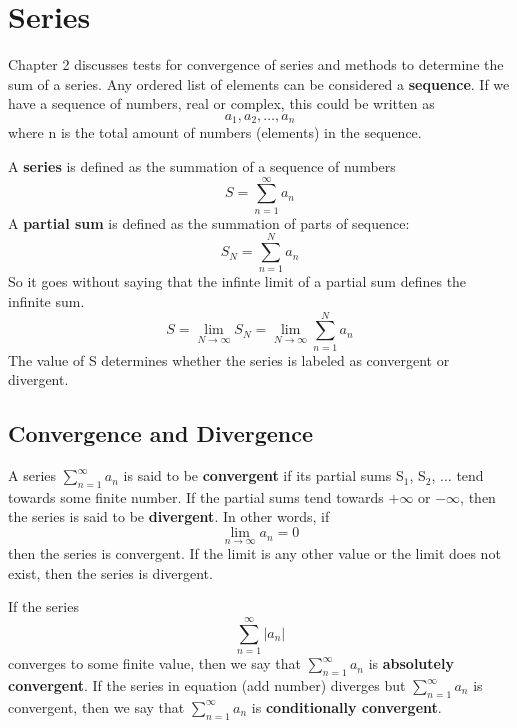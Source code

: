 \documentclass{article}
\newcommand{\be}{\begin{equation}}
\newcommand{\ee}{\end{equation}}
\begin{document}
\section*{Series}
Chapter 2 discusses tests for convergence of series and methods to determine the sum of a series.
Any ordered list of elements can be considered a \textbf{sequence}.
If we have a sequence of numbers, real or complex, this could be written as
\be
  a_1, a_2, \hdots, a_n
\ee
where n is the total amount of numbers (elements) in the sequence.

A \textbf{series} is defined as the summation of a sequence of numbers
\be
S=\sum_{n=1}^{\infty} a_n
\ee
A \textbf{partial sum} is defined as the summation of parts of sequence:
\be
S_N = \sum_{n=1}^{N} a_n
\ee
So it goes without saying that the infinte limit of a partial sum defines the infinite sum.
\be
S = \lim_{N \to \infty}{S_N} = \lim_{N \to \infty} \sum_{n=1}^{N} a_n
\ee
The value of S determines whether the series is labeled as convergent or divergent.
\subsection*{Convergence and Divergence}
A series $\sum\limits_{n=1}^{\infty} a_n$ is said to be \textbf{convergent} if its partial sums S$_1$, S$_2$, $\hdots$ tend towards some finite number.
If the partial sums tend towards $+\infty$ or $-\infty$, then the series is said to be \textbf{divergent}.
In other words, if
\be
\lim_{n \to \infty}{a_n} = 0
\ee
then the series is convergent.
If the limit is any other value or the limit does not exist, then the series is divergent.

If the series
\be
\sum_{n=1}^{\infty} |a_n|
\ee
converges to some finite value, then we say that $\sum\limits_{n=1}^{\infty} a_n$ is \textbf{absolutely convergent}.
If the series in equation (add number) diverges but $\sum\limits_{n=1}^{\infty} a_n$ is convergent, then we say that $\sum\limits_{n=1}^{\infty} a_n$ is \textbf{conditionally convergent}.
\end{document}
